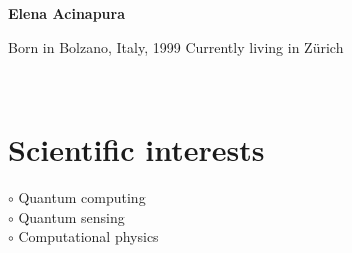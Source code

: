 \documentclass[a4paper,10pt]{article}
\begin{document}
\thispagestyle{empty}

\begin{adjustbox}{valign=t}
\begin{minipage}{0.3\textwidth} %
\begin{center}

\MySkip 	%

{\LARGE \bfseries Elena Acinapura}

\MySkip 	%

Born in Bolzano, Italy, 1999
Currently living in Zürich\\

\MySkip 	%

\textcolor{ColorTwo}{\faEnvelopeO} 
 \\

\textcolor{ColorTwo}{\faChain} 
\end{center}

\vfill

\section*{Scientific interests}
\raggedright
\textcolor{ColorOne}{$\circ$} Quantum computing\\
\textcolor{ColorOne}{$\circ$} Quantum sensing\\
\textcolor{ColorOne}{$\circ$} Computational physics\\


\end{minipage}
\end{adjustbox}
\end{document}
